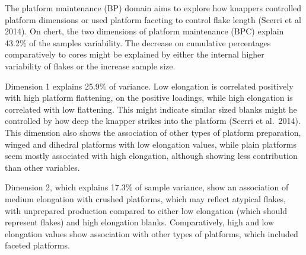 \documentclass[12pt,twoside]{reedthesis}
\begin{document}
The platform maintenance (BP) domain aims to explore how knappers controlled platform dimensions or used platform faceting to control flake length (Scerri et al 2014). On chert, the two dimensions of platform maintenance (BPC) explain 43.2\% of the samples variability. The decrease on cumulative percentages comparatively to cores might be explained by either the internal higher variability of flakes or the increase sample size.

Dimension 1 explains 25.9\% of variance. Low elongation is correlated positively with high platform flattening, on the positive loadings, while high elongation is correlated with low flattening. This might indicate similar sized blanks might he controlled by how deep the knapper strikes into the platform (Scerri et al.~2014). This dimension also shows the association of other types of platform preparation, winged and dihedral platforms with low elongation values, while plain platforms seem mostly associated with high elongation, although showing less contribution than other variables.

Dimension 2, which explains 17.3\% of sample variance, show an association of medium elongation with crushed platforms, which may reflect atypical flakes, with unprepared production compared to either low elongation (which should represent flakes) and high elongation blanks. Comparatively, high and low elongation values show association with other types of platforms, which included faceted platforms.
\end{document}
